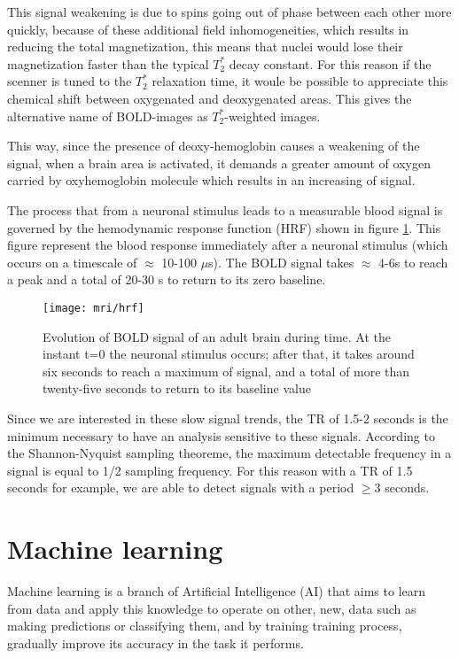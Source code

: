 \documentclass[11pt]{report}
\begin{document}
This signal weakening is due to spins going out of phase between each other more quickly, because of these additional field inhomogeneities, which results in reducing the total magnetization, this means that nuclei would lose their magnetization faster than the typical $T_2^*$ decay constant.
For this reason if the scenner is tuned to the $T_2^*$ relaxation time, it woule be possible to appreciate this chemical shift between oxygenated and deoxygenated areas. This gives the alternative name of BOLD-images as $T_2^{\ast}$-weighted images. \cite{huettel-2009}

This way, since the presence of deoxy-hemoglobin causes a weakening of the signal, when a brain area is activated, it demands a greater amount of oxygen carried by oxyhemoglobin molecule which results in an increasing of signal.

The process that from a neuronal stimulus leads to a measurable blood signal is governed by the hemodynamic response function (HRF) shown in figure \ref{fig:hrf}. This figure represent the blood response immediately after a neuronal stimulus (which occurs on a timescale of $\approx$ 10-100 $\mu$s). The BOLD signal takes $\approx$ 4-6s to reach a peak and a total of 20-30 s to return to its zero baseline.

\begin{figure}[h]
\centering
\texttt{[image: mri/hrf]}
\caption{Evolution of BOLD signal of an adult brain during time. At the instant t=0 the neuronal stimulus occurs; after that, it takes around six seconds to reach a maximum of signal, and a total of more than twenty-five seconds to return to its baseline value}
\label{fig:hrf}
\end{figure}


Since we are interested in these slow signal trends, the TR of 1.5-2 seconds is the minimum necessary to have an analysis sensitive to these signals.
According to the Shannon-Nyquist sampling theoreme, the maximum detectable frequency in a signal is equal to 1/2 sampling frequency. For this reason with a TR of 1.5 seconds for example, we are able to detect signals with a period $\geq 3$ seconds.




\chapter{Machine learning}\label{chap:machine_learning}

Machine learning is a branch of Artificial Intelligence (AI) that aims to learn from data and apply this knowledge to operate on other, new, data such as making predictions or classifying them, and by training training process, gradually improve its accuracy in the task it performs.
\end{document}
